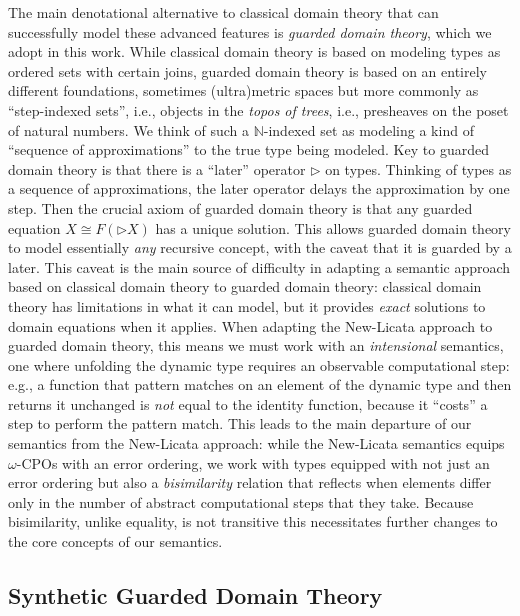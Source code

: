 The main denotational alternative to classical domain theory that can
successfully model these advanced features is \emph{guarded domain
theory}, which we adopt in this work. While classical domain theory is
based on modeling types as ordered sets with certain joins, guarded
domain theory is based on an entirely different foundations, sometimes
(ultra)metric spaces but more commonly as ``step-indexed sets'', i.e.,
objects in the \emph{topos of trees}, i.e., presheaves on the poset of
natural numbers\cite{birkedal-mogelberg-schwinghammer-stovring2011}. We think of such a
$\mathbb{N}$-indexed set as modeling a kind of ``sequence of
approximations'' to the true type being modeled.
%
Key to guarded domain theory is that there is a ``later'' operator
$\triangleright$ on types. Thinking of types as a sequence of
approximations, the later operator delays the approximation by one
step. Then the crucial axiom of guarded domain theory is that any
guarded equation $X \cong F(\triangleright X)$ has a unique
solution. This allows guarded domain theory to model essentially
\emph{any} recursive concept, with the caveat that it is guarded by a
later.
%
This caveat is the main source of difficulty in adapting a semantic
approach based on classical domain theory to guarded domain theory:
classical domain theory has limitations in what it can model, but it
provides \emph{exact} solutions to domain equations when it
applies. When adapting the New-Licata approach to guarded domain
theory, this means we must work with an \emph{intensional} semantics,
one where unfolding the dynamic type requires an observable
computational step: e.g., a function that pattern matches on an
element of the dynamic type and then returns it unchanged is
\emph{not} equal to the identity function, because it ``costs'' a step
to perform the pattern match.
%
This leads to the main departure of our semantics from the New-Licata
approach: while the New-Licata semantics equips $\omega$-CPOs with an
error ordering, we work with types equipped with not just an error
ordering but also a \emph{bisimilarity} relation that reflects when
elements differ only in the number of abstract computational steps
that they take.
%
Because bisimilarity, unlike equality, is not transitive this
necessitates further changes to the core concepts of our semantics.

\subsection{Synthetic Guarded Domain Theory}

